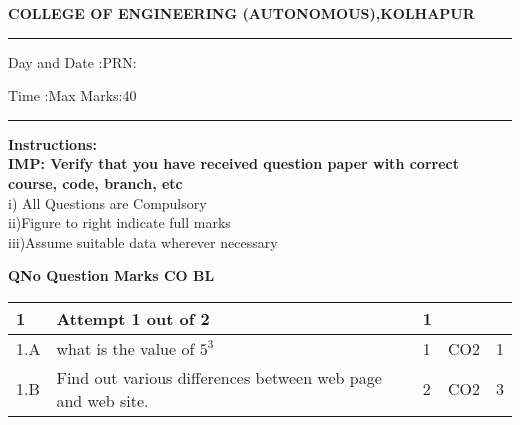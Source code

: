 \documentclass[12pt]{article}
\begin{document}
	\par
	{\bf{COLLEGE OF ENGINEERING (AUTONOMOUS),KOLHAPUR}}
	\par\noindent\rule{\textwidth}{0.4pt}
	
	\par
	\par
	\par
\begin{flushleft}
	Day and Date :{}\hspace{5.5cm}PRN:
\end{flushleft}

\begin{flushleft}
	Time :{}\hspace{7cm}Max Marks:{40}\\
\end{flushleft}
\noindent\rule{\textwidth}{0.1pt}
\begin{flushleft}
	{\bf Instructions:}\\
	{\hspace{0.5cm} \bf IMP: Verify that you have received question paper with correct course, code, branch, etc}\\
	\hspace{1cm}i) All Questions are Compulsory\\
	\hspace{1cm}ii)Figure to right indicate full marks\\
	\hspace{1cm}iii)Assume suitable data wherever necessary\\
\end{flushleft} 

	\begin{flushleft}
	\bf{QNo}\hspace{1.2cm} \bf{Question} \hspace{5.5cm}  \bf{Marks} \hspace{0.2cm} \bf{CO} \hspace{0.2cm}	\bf{BL}	
	
	
	
	
	
	
\end{flushleft}

		

	
	
	\begin{tabular}{|L{1cm}|L{8cm}|C{1cm}|C{1cm}|C{1cm}|}\hline
			\bf1 & \bf{Attempt} \bf1 out of \bf2 & \bf1 & & \\ \hline
				1.A &
	what  is the value of  $5^{3}$ \newline
		 &  1 & CO2 & 1\\ \hline
		1.B &
	Find out various differences between web page and web site. \newline
		 &  2 & CO2 & 3\\ \hline
		\end{tabular}
\end{document}
